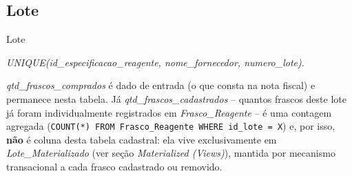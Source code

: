 \subsection{Lote}
\begin{entidade}{Lote}
\end{entidade}
\begin{regra}
\textit{UNIQUE(id\_especificacao\_reagente, nome\_fornecedor, numero\_lote)}.
\end{regra}
\begin{explicacao}
\textit{qtd\_frascos\_comprados} é dado de entrada (o que consta na nota fiscal) e permanece nesta tabela. Já \textit{qtd\_frascos\_cadastrados} -- quantos frascos deste lote já foram individualmente registrados em \textit{Frasco\_Reagente} -- é uma contagem agregada (\texttt{COUNT(*) FROM Frasco\_Reagente WHERE id\_lote = X}) e, por isso, \textbf{não} é coluna desta tabela cadastral: ela vive exclusivamente em \textit{Lote\_Materializado} (ver seção \textit{Materialized (Views)}), mantida por mecanismo transacional a cada frasco cadastrado ou removido.
\end{explicacao}
